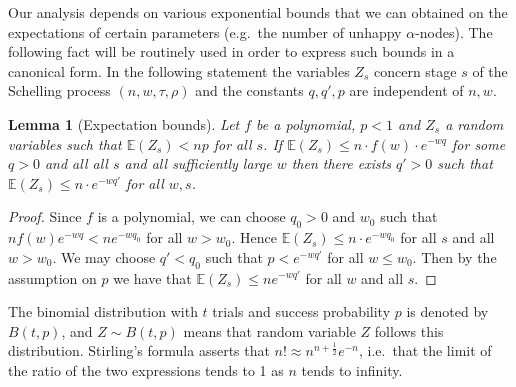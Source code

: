 \documentclass[11pt]{article}
\theoremstyle{plain}
\newtheorem{lem}[thm]{Lemma}
\numberwithin{equation}{subsection}
\begin{document}
Our analysis depends on various exponential bounds that we can obtained
on the expectations of 
certain parameters (e.g.\ the number of unhappy $\alpha$-nodes).
The following fact will be routinely used in order to express such bounds in 
a canonical form.
In the following statement 
the variables $Z_s$ concern stage $s$ of the Schelling process
$(n, w, \tau, \rho)$ and
the constants $q,q',p$ are independent of 
$n, w$. 
\begin{lem}[Expectation bounds]\label{le:boundstech}
Let $f$ be a polynomial, $p<1$ and $Z_s$ a random variables such 
that $\mathbb{E}(Z_s)<np$ for all $s$.
If $\mathbb{E}(Z_s)\leq n \cdot f(w)\cdot  e^{-wq}$ for some $q>0$ and all
all $s$ and all sufficiently large $w$ then
there exists $q'>0$ such that 
$\mathbb{E}(Z_s)\leq n\cdot e^{-wq'}$ for all $w,s$.
\end{lem}
\begin{proof}
Since $f$ is a polynomial, we can choose $q_0>0$ and $w_0$ such that
$n f(w) e^{-wq}< n e^{-wq_0}$ for all $w>w_0$. 
Hence $\mathbb{E}(Z_s)\leq n\cdot e^{-wq_0}$ for all $s$ and all $w>w_0$.
We may choose $q'<q_0$ such that $p<e^{-wq'}$ for all $w\leq w_0$.
Then by the assumption on $p$ we have that   
$\mathbb{E}(Z_s)\leq n e^{-wq'}$ for all $w$ and all $s$.
\end{proof}

The binomial distribution with
$t$ trials and success probability $p$ is denoted by $B(t,p)$, and 
$Z\sim B(t,p)$ means that  random variable $Z$ follows this distribution.
Stirling's formula 
asserts that $n! \approx n^{n + \frac{1}{2}} e^{-n}$,
i.e.\ that the limit of the ratio of the two expressions tends to 1 as
$n$ tends to infinity.
\end{document}
